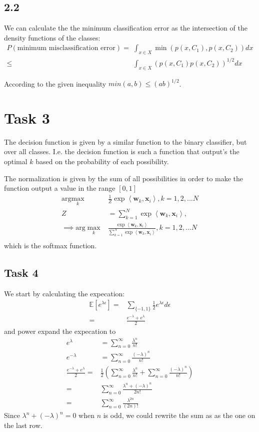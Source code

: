 \documentclass{article}
\begin{document}
\subsection*{2.2}
We can calculate the the minimum classification error as the intersection of the density functions of the classes:
\begin{align}
	P(\text{minimum misclassification error})=& \int_{x \in X} \min(p(x, C_1),p(x, C_2))dx \\
	\leq& \int_{x \in X} (p(x, C_1)p(x, C_2))^{1/2}dx
\end{align}

According to the given inequality $min(a, b) \leq (ab)^{1/2}$.

\section*{Task 3}
The decision function is given by a similar function to the binary classifier, but over all classes. I.e. the decision function is such a function that output's the optimal $k$ based on the probability of each possibility.

The normalization is given by the sum of all possibilities in order to make the function output a value in the range $[0,1]$
\begin{align}
	\text{arg}\max_k& \frac{1}{Z}\exp\left\langle \mathbf{w}_k,\mathbf{x}_i\right\rangle, k= 1,2,...N \\
	Z &= \sum_{k=1}^{N}\exp\left\langle \mathbf{w}_k,\mathbf{x}_i\right\rangle, \\
	\implies
	\text{arg}\max_k& \frac{\exp\left\langle \mathbf{w}_k,\mathbf{x}_i\right\rangle}{\sum_{k=1}^{N}\exp\left\langle \mathbf{w}_k,\mathbf{x}_i\right\rangle}, k= 1,2,...N \\
\end{align}
which is the softmax function.

\subsection*{Task 4}
We start by calculating the expecation:
\begin{align}
	\mathbb{E}[e^{\lambda\epsilon}] =& \sum_{\{-1,1\}}\frac{1}{2}e^{\lambda\epsilon}d\epsilon\\
	=& \frac{e^{-\lambda} + e^{\lambda}}{2}
\end{align}
and power expand the expecation to
\begin{align}
	e^{\lambda} &= \sum_{n=0}^{\infty} \frac{\lambda^n}{n!}\\
	e^{-\lambda} &= \sum_{n=0}^{\infty} \frac{(-\lambda)^n}{n!} \\
	\frac{e^{-\lambda} + e^{\lambda}}{2} =& \frac{1}{2}\left(  \sum_{n=0}^{\infty} \frac{\lambda^n}{n!} + \sum_{n=0}^{\infty} \frac{(-\lambda)^n}{n!}\right) \\
	=& \sum_{n=0}^{\infty} \frac{\lambda^n + (-\lambda)^n}{2n!} \\
	=& \sum_{n=0}^{\infty} \frac{\lambda^{2n}}{(2n)!} 
\end{align}
Since $\lambda^n + (-\lambda)^n = 0$ when $n$ is odd, we could rewrite the sum as as the one on the last row.
\end{document}
